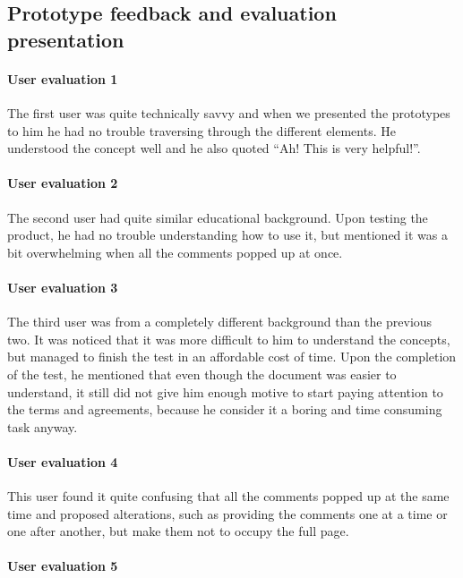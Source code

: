 \subsection{Prototype feedback and evaluation presentation}

\paragraph{User evaluation 1}

The first user was quite technically savvy and when we presented the prototypes 
to him he had no trouble traversing through the different elements. He 
understood the concept well and he also quoted ``Ah! This is very helpful!''.

\paragraph{User evaluation 2}

The second user had quite similar educational background. Upon testing the 
product, he had no trouble understanding how to use it, but mentioned it was a 
bit overwhelming when all the comments popped up at once.

\paragraph{User evaluation 3}

The third user was from a completely different background than the previous two. 
It was noticed that it was more difficult to him to understand the concepts, but 
managed to finish the test in an affordable cost of time. Upon the completion of 
the test, he mentioned that even though the document was easier to understand, 
it still did not give him enough motive to start paying attention to the terms 
and agreements, because he consider it a boring and time consuming task anyway.

\paragraph{User evaluation 4}

This user found it quite confusing that all the comments popped up at the same 
time and proposed alterations, such as providing the comments one at a time or 
one after another, but make them not to occupy the full page.

\paragraph{User evaluation 5}

